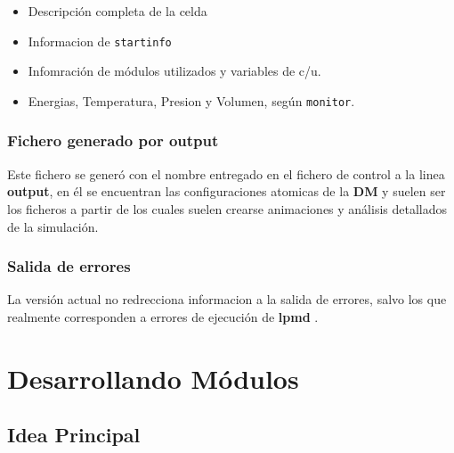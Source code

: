 \documentclass[a4paper,10pt]{scrbook}
\newcommand{\lpmd}{\textbf{lpmd }}
\begin{document}
\begin{itemize}
 \item Descripci\'on completa de la celda
 \item Informacion de \verb|startinfo|
 \item Infomraci\'on de m\'odulos utilizados y variables de c/u.
 \item Energias, Temperatura, Presion y Volumen, seg\'un \verb|monitor|.
\end{itemize}


\subsection{Fichero generado por output}
Este fichero se gener\'o con el nombre entregado en el fichero de control a la linea \textbf{output}, en \'el se encuentran las configuraciones atomicas de la \textbf{DM} y suelen ser los ficheros a partir de los cuales suelen crearse animaciones y an\'alisis detallados de la simulaci\'on.


\subsection{Salida de errores}
La versi\'on actual no redrecciona informacion a la salida de errores, salvo los que realmente corresponden a errores de ejecuci\'on de \lpmd.

\chapter{Desarrollando M\'odulos}
\label{chap:own}

\section{Idea Principal}
\end{document}
